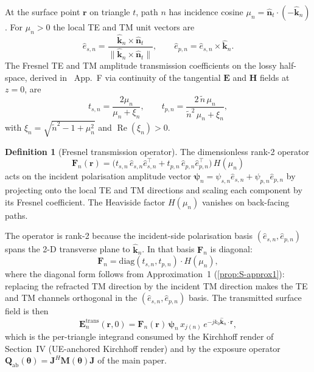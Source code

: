 \documentclass[10pt,journal,twocolumn]{IEEEtran}
\newcommand{\rr}{\bm{r}}
\newcommand{\nhat}{\hat{\bm{n}}}
\newcommand{\khat}{\hat{\bm{k}}}
\newcommand{\Qabs}{\mathbf{Q}_{\mathrm{ab}}}
\newcommand{\Jmat}{\mathbf{J}}
\newcommand{\Fn}{\mathbf{F}_n}
\newcommand{\psin}{\bm{\psi}_n}
\newcommand{\thetab}{\bm{\theta}}
\newcommand{\ntilde}{\tilde{n}}
\DeclareMathOperator{\RE}{Re}
\theoremstyle{plain}
\theoremstyle{definition}
\newtheorem{definition}[proposition]{Definition}
\begin{document}
At the surface point $\rr$ on triangle $t$, path $n$ has incidence
cosine $\mu_n = \nhat_t \cdot (-\khat_n)$. For $\mu_n > 0$ the local
TE and TM unit vectors are
\begin{equation}\label{eq:S-TE-TM-basis}
  \hat{e}_{s,n} = \frac{\khat_n \times \nhat_t}
                       {\|\khat_n \times \nhat_t\|},
  \qquad
  \hat{e}_{p,n} = \hat{e}_{s,n} \times \khat_n.
\end{equation}
The Fresnel TE and TM amplitude transmission coefficients on the
lossy half-space, derived in~\cite{WydaegheMonograph} App.~F via
continuity of the tangential $\bm{E}$ and $\bm{H}$ fields at $z=0$,
are
\begin{equation}\label{eq:S-fresnel-t}
  t_{s,n} = \frac{2 \mu_n}{\mu_n + \xi_n},
  \qquad
  t_{p,n} = \frac{2\,\ntilde\,\mu_n}{\ntilde^2\,\mu_n + \xi_n},
\end{equation}
with $\xi_n = \sqrt{\ntilde^2 - 1 + \mu_n^2}$ and $\RE(\xi_n) > 0$.

\begin{definition}[Fresnel transmission operator]\label{def:S-Fn}
The dimensionless rank-2 operator
\begin{equation}\label{eq:S-Fn-def}
  \Fn(\rr) =
  \bigl(t_{s,n}\,\hat{e}_{s,n}\hat{e}_{s,n}^{\!\top}
      + t_{p,n}\,\hat{e}_{p,n}\hat{e}_{p,n}^{\!\top}\bigr)\,H(\mu_n)
\end{equation}
acts on the incident polarisation amplitude vector
$\psin = \psi_{s,n}\hat{e}_{s,n} + \psi_{p,n}\hat{e}_{p,n}$ by
projecting onto the local TE and TM directions and scaling each
component by its Fresnel coefficient. The Heaviside factor
$H(\mu_n)$ vanishes on back-facing paths.
\end{definition}

The operator is rank-2 because the incident-side polarisation basis
$(\hat{e}_{s,n}, \hat{e}_{p,n})$ spans the 2-D transverse plane to
$\khat_n$. In that basis $\Fn$ is diagonal:
\begin{equation}\label{eq:S-Fn-diag}
  \Fn = \mathrm{diag}(t_{s,n}, t_{p,n}) \cdot H(\mu_n),
\end{equation}
where the diagonal form follows from Approximation~1
(\cref{prop:S-approx1}): replacing the refracted TM direction by the
incident TM direction makes the TE and TM channels orthogonal in the
$(\hat{e}_{s,n}, \hat{e}_{p,n})$ basis. The transmitted surface
field is then
\begin{equation}\label{eq:S-Etrans}
  \bm{E}_n^{\mathrm{trans}}(\rr, 0)
    = \Fn(\rr)\,\psin\,x_{j(n)}\,e^{-jk_0\khat_n\cdot\rr},
\end{equation}
which is the per-triangle integrand consumed by the Kirchhoff render
of Section~IV (UE-anchored Kirchhoff render) and by the exposure
operator $\Qabs(\thetab) = \Jmat^{H}\mathbf{M}(\thetab)\Jmat$ of
the main paper.
\end{document}
